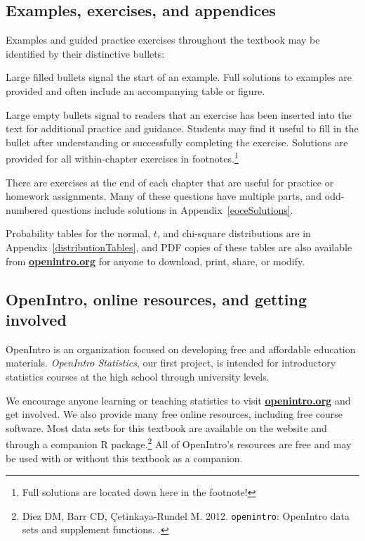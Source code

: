 \textPE{\pagebreak}


\subsection*{Examples, exercises, and appendices}

Examples and guided practice exercises throughout the textbook may be identified by their distinctive bullets:

\begin{example}{Large filled bullets signal the start of an example.}
Full solutions to examples are provided and often include an accompanying table or figure.
 \end{example}

\begin{exercise}
Large empty bullets signal to readers that an exercise has been inserted into the text for additional practice and guidance. Students may find it useful to fill in the bullet after understanding or successfully completing the exercise. Solutions are provided for all within-chapter exercises in footnotes.\footnote{Full solutions are located down here in the footnote!}
\end{exercise}

There are exercises at the end of each chapter that are useful for practice or homework assignments. Many of these questions have multiple parts, and odd-numbered questions include solutions in Appendix~\ref{eoceSolutions}.

Probability tables for the normal, $t$, and chi-square distributions are in Appendix~\ref{distributionTables}, and PDF copies of these tables are also available from \href{http://www.openintro.org}{\color{black}\textbf{openintro.org}} for anyone to download, print, share, or modify.


\subsection*{OpenIntro, online resources, and getting involved}

OpenIntro is an organization focused on developing free and affordable education materials. \emph{OpenIntro Statistics}, our first project, is intended for introductory statistics courses at the high school through university levels.

We encourage anyone learning or teaching statistics to visit \href{http://www.openintro.org}{\color{black}\textbf{openintro.org}} and get involved. We also provide many free online resources, including free course software. Most data sets for this textbook are available on the website and through a companion R package.\footnote{Diez DM, Barr CD, \c{C}etinkaya-Rundel M. 2012. \texttt{openintro}: OpenIntro data sets and supplement functions. .} All of OpenIntro's resources are free and may be used with or without this textbook as a companion.

